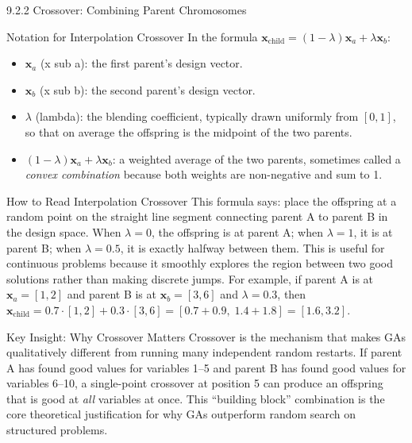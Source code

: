 \documentclass[aspectratio=169,10pt]{beamer}
\newcommand{\bx}{\mathbf{x}}
\begin{document}
\begin{frame}[allowframebreaks]{9.2.2 Crossover: Combining Parent Chromosomes}
  \begin{block}{Notation for Interpolation Crossover}
    In the formula $\bx_{\text{child}} = (1-\lambda)\bx_a + \lambda\bx_b$:
    \begin{itemize}
      \item $\bx_a$ (x sub a): the first parent's design vector.
      \item $\bx_b$ (x sub b): the second parent's design vector.
      \item $\lambda$ (lambda): the blending coefficient, typically
            drawn uniformly from $[0, 1]$, so that on average the
            offspring is the midpoint of the two parents.
      \item $(1-\lambda)\bx_a + \lambda\bx_b$: a weighted average
            of the two parents, sometimes called a \emph{convex
            combination} because both weights are non-negative and
            sum to 1.
    \end{itemize}
  \end{block}

  \begin{alertblock}{How to Read Interpolation Crossover}
    This formula says: place the offspring at a random point on the
    straight line segment connecting parent A to parent B in the
    design space.  When $\lambda = 0$, the offspring is at parent A;
    when $\lambda = 1$, it is at parent B; when $\lambda = 0.5$,
    it is exactly halfway between them.  This is useful for
    continuous problems because it smoothly explores the region
    between two good solutions rather than making discrete jumps.
    For example, if parent A is at $\bx_a = [1, 2]$ and parent B
    is at $\bx_b = [3, 6]$ and $\lambda = 0.3$, then
    $\bx_{\text{child}} = 0.7 \cdot [1,2] + 0.3 \cdot [3,6]
    = [0.7+0.9,\; 1.4+1.8] = [1.6, 3.2]$.
  \end{alertblock}

  \begin{alertblock}{Key Insight: Why Crossover Matters}
    Crossover is the mechanism that makes GAs qualitatively different
    from running many independent random restarts.  If parent A has
    found good values for variables 1--5 and parent B has found good
    values for variables 6--10, a single-point crossover at position 5
    can produce an offspring that is good at \emph{all} variables at
    once.  This ``building block'' combination is the core theoretical
    justification for why GAs outperform random search on structured
    problems.
  \end{alertblock}

\end{frame}
\end{document}

